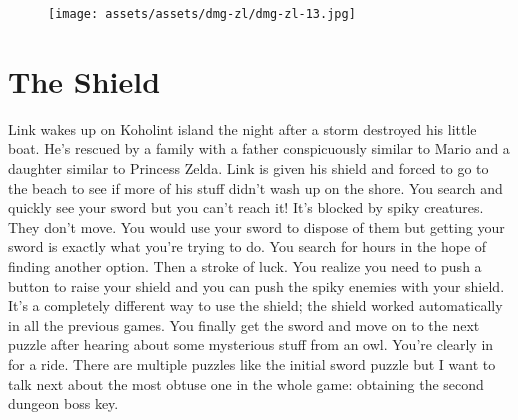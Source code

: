 \documentclass{book}
\let\oldcenter\center
\let\oldendcenter\endcenter
\renewenvironment{center}{\setlength\topsep{0pt}\oldcenter}{\oldendcenter}
\begin{document}
\begin{center}
\quad\vspace{4pt}
\quad\vspace{4pt}
\quad\vspace{4pt}
\quad\vspace{4pt}
\quad\vspace{4pt}
\quad\vspace{4pt}
\quad\vspace{4pt}
\quad\vspace{4pt}
\end{center}

\begin{figure}[hbt]
\vskip 10pt
\centering \texttt{[image: assets/assets/dmg-zl/dmg-zl-13.jpg]}
\vskip 6pt
\end{figure}

\FloatBarrier\needspace{10mm}\section*{The Shield}\nopagebreak[4]

Link wakes up on Koholint island the night after a storm destroyed his little boat. He’s rescued by a family with a father conspicuously similar to Mario and a daughter similar to Princess Zelda. Link is given his shield and forced to go to the beach to see if more of his stuff didn’t wash up on the shore. You search and quickly see your sword but you can’t reach it! It’s blocked by spiky creatures. They don’t move. You would use your sword to dispose of them but getting your sword is exactly what you’re trying to do. You search for hours in the hope of finding another option. Then a stroke of luck. You realize you need to push a button to raise your shield and you can push the spiky enemies with your shield. It’s a completely different way to use the shield; the shield worked automatically in all the previous games. You finally get the sword and move on to the next puzzle after hearing about some mysterious stuff from an owl. You’re clearly in for a ride. There are multiple puzzles like the initial sword puzzle but I want to talk next about the most obtuse one in the whole game: obtaining the second dungeon boss key.
\end{document}
